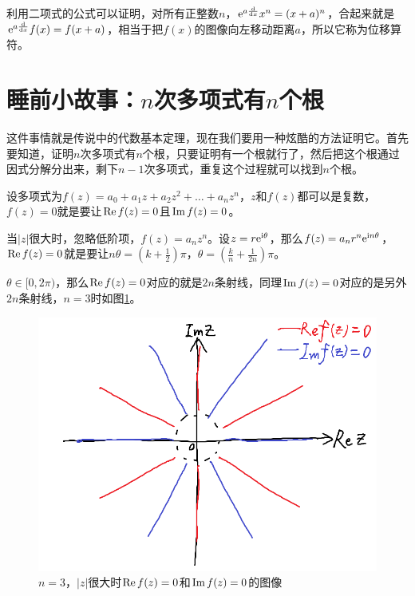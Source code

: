 利用二项式的公式可以证明，对所有正整数$n$，$\mathrm{e}^{a \frac{\mathop{}\!\mathrm{d}}{\mathop{}\!\mathrm{d} x}} x^n=(x+a)^n$，合起来就是$\mathrm{e}^{a \frac{\mathop{}\!\mathrm{d}}{\mathop{}\!\mathrm{d} x}} f(x)=f(x+a)$，相当于把$f(x)$的图像向左移动距离$a$，所以它称为位移算符。
\section{睡前小故事：$n$次多项式有$n$个根}
这件事情就是传说中的代数基本定理，现在我们要用一种炫酷的方法证明它。首先要知道，证明$n$次多项式有$n$个根，只要证明有一个根就行了，然后把这个根通过因式分解分出来，剩下$n-1$次多项式，重复这个过程就可以找到$n$个根。

设多项式为$f(z)=a_0 +a_1 z+a_2 z^2+\dots+a_n z^n$，$z$和$f(z)$都可以是复数，$f(z)=0$就是要让$\mathrm{Re}\mathop{}\! f(z)=0$且$\mathrm{Im}\mathop{}\! f(z)=0$。

当$|z|$很大时，忽略低阶项，$f(z)=a_n z^n$。设$z=r \mathrm{e}^{\mathrm{i} \theta}$，那么$f(z)=a_n r^n \mathrm{e}^{\mathrm{i} n \theta}$，$\mathrm{Re}\mathop{}\! f(z)=0$就是要让$n \theta=(k+\frac{1}{2})\pi$，$\theta=(\frac{k}{n}+\frac{1}{2n})\pi$。

$\theta \in [0,2\pi)$，那么$\mathrm{Re}\mathop{}\! f(z)=0$对应的就是$2n$条射线，同理$\mathrm{Im}\mathop{}\! f(z)=0$对应的是另外$2n$条射线，$n=3$时如图\ref{fig-poly-root-outer}。
\begin{figure}[htb]
\centering
\includegraphics[scale=0.5]{fig/poly-root-outer.png}
\caption{$n=3$，$|z|$很大时$\mathrm{Re}\mathop{}\! f(z)=0$和$\mathrm{Im}\mathop{}\! f(z)=0$的图像}
\label{fig-poly-root-outer}
\end{figure}

